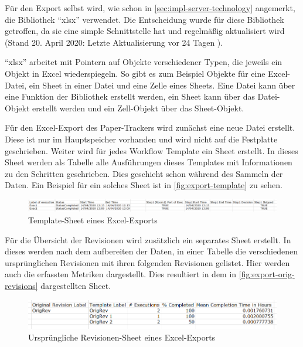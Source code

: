 Für den Export selbst wird, wie schon in \autoref{sec:impl-server-technology} angemerkt, die Bibliothek \enquote{xlsx} verwendet.
Die Entscheidung wurde für diese Bibliothek getroffen, da sie eine simple Schnittstelle hat und regelmäßig aktualisiert wird
(Stand 20. April 2020: Letzte Aktualisierung vor 24 Tagen \cite{tealeg2020}).

\enquote{xlsx} arbeitet mit Pointern auf Objekte verschiedener Typen, die jeweils ein Objekt in Excel wiederspiegeln.
So gibt es zum Beispiel Objekte für eine Excel-Datei, ein Sheet in einer Datei und eine Zelle eines Sheets.
Eine Datei kann über eine Funktion der Bibliothek erstellt werden, ein Sheet kann über das Datei-Objekt erstellt werden
und ein Zell-Objekt über das Sheet-Objekt.

Für den Excel-Export des Paper-Trackers wird zunächst eine neue Datei erstellt.
Diese ist nur im Hauptspeicher vorhanden und wird nicht auf die Festplatte geschrieben.
Weiter wird für jedes Workflow Template ein Sheet erstellt.
In dieses Sheet werden als Tabelle alle Ausführungen dieses Templates mit Informationen zu den Schritten geschrieben.
Dies geschieht schon während des Sammeln der Daten.
Ein Beispiel für ein solches Sheet ist in \autoref{fig:export-template} zu sehen.

\begin{figure}[htbp]
	\includegraphics[width=\textwidth]{images/export_template.png}
	\centering
	\caption{Template-Sheet eines Excel-Exports}
	\label{fig:export-template}
\end{figure}

Für die Übersicht der Revisionen wird zusätzlich ein separates Sheet erstellt.
In dieses werden nach dem aufbereiten der Daten, in einer Tabelle die verschiedenen ursprünglichen Revisionen
mit ihren folgenden Revisionen gelistet.
Hier werden auch die erfassten Metriken dargestellt.
Dies resultiert in dem in \autoref{fig:export-orig-revisions} dargestellten Sheet.

\begin{figure}[htbp]
	\includegraphics[width=\textwidth]{images/export_orig_revisions.png}
	\centering
	\caption{Ursprüngliche Revisionen-Sheet eines Excel-Exports}
	\label{fig:export-orig-revisions}
\end{figure}

